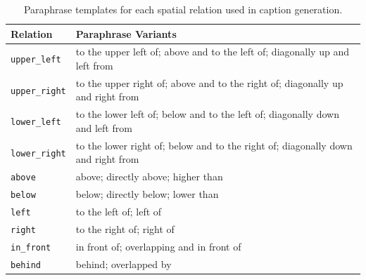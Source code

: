 \documentclass[10pt,twocolumn,letterpaper]{article}
\begin{document}
\begin{table}[!hb]
\centering
\small
\begin{tabular}{ll}
\toprule
\textbf{Relation} & \textbf{Paraphrase Variants} \\
\midrule
\texttt{upper\_left} 
& to the upper left of; above and to the left of; diagonally up and left from \\
\texttt{upper\_right} 
& to the upper right of; above and to the right of; diagonally up and right from \\
\texttt{lower\_left} 
& to the lower left of; below and to the left of; diagonally down and left from \\
\texttt{lower\_right} 
& to the lower right of; below and to the right of; diagonally down and right from \\
\texttt{above} 
& above; directly above; higher than \\
\texttt{below} 
& below; directly below; lower than \\
\texttt{left} 
& to the left of; left of \\
\texttt{right} 
& to the right of; right of \\
\texttt{in\_front} 
& in front of; overlapping and in front of \\
\texttt{behind} 
& behind; overlapped by \\
\bottomrule
\end{tabular}
\caption{Paraphrase templates for each spatial relation used in caption generation.}
\label{tab:spatial_paraphrases}
\end{table}
\newpage
\end{document}
